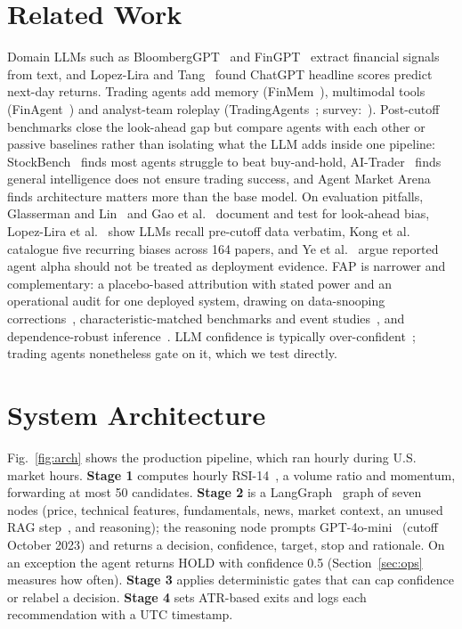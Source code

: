 \documentclass[conference]{IEEEtran}
\begin{document}
\section{Related Work}
Domain LLMs such as BloombergGPT~\cite{wu2023bloomberggpt} and FinGPT~\cite{yang2023fingpt} extract financial signals from text, and Lopez-Lira and Tang~\cite{lopezlira2023chatgpt} found ChatGPT headline scores predict next-day returns. Trading agents add memory (FinMem~\cite{yu2023finmem}), multimodal tools (FinAgent~\cite{zhang2024finagent}) and analyst-team roleplay (TradingAgents~\cite{xiao2024tradingagents}; survey:~\cite{ding2024survey}). Post-cutoff benchmarks close the look-ahead gap but compare agents with each other or passive baselines rather than isolating what the LLM adds inside one pipeline: StockBench~\cite{chen2025stockbench} finds most agents struggle to beat buy-and-hold, AI-Trader~\cite{fan2025aitrader} finds general intelligence does not ensure trading success, and Agent Market Arena~\cite{qian2025agents} finds architecture matters more than the base model. On evaluation pitfalls, Glasserman and Lin~\cite{glasserman2023lookahead} and Gao et al.~\cite{gao2025lookahead} document and test for look-ahead bias, Lopez-Lira et al.~\cite{lopezlira2025memorization} show LLMs recall pre-cutoff data verbatim, Kong et al.~\cite{kong2026bias} catalogue five recurring biases across 164 papers, and Ye et al.~\cite{ye2026alphaillusion} argue reported agent alpha should not be treated as deployment evidence. FAP is narrower and complementary: a placebo-based attribution with stated power and an operational audit for one deployed system, drawing on data-snooping corrections~\cite{harvey2016cross,bailey2014deflated}, characteristic-matched benchmarks and event studies~\cite{daniel1997measuring,brown1985event}, and dependence-robust inference~\cite{kunsch1989jackknife,newey1987simple}. LLM confidence is typically over-confident~\cite{guo2017calibration,kadavath2022know,xiong2024uncertainty}; trading agents nonetheless gate on it, which we test directly.

\section{System Architecture}
\label{sec:system}
Fig.~\ref{fig:arch} shows the production pipeline, which ran hourly during U.S. market hours. \textbf{Stage 1} computes hourly RSI-14~\cite{wilder1978new}, a volume ratio and momentum, forwarding at most 50 candidates. \textbf{Stage 2} is a LangGraph~\cite{langgraph} graph of seven nodes (price, technical features, fundamentals, news, market context, an unused RAG step~\cite{lewis2020rag}, and reasoning); the reasoning node prompts GPT-4o-mini~\cite{openai2024gpt4o} (cutoff October 2023) and returns a decision, confidence, target, stop and rationale. On an exception the agent returns HOLD with confidence 0.5 (Section~\ref{sec:ops} measures how often). \textbf{Stage 3} applies deterministic gates that can cap confidence or relabel a decision. \textbf{Stage 4} sets ATR-based exits and logs each recommendation with a UTC timestamp.
\end{document}
